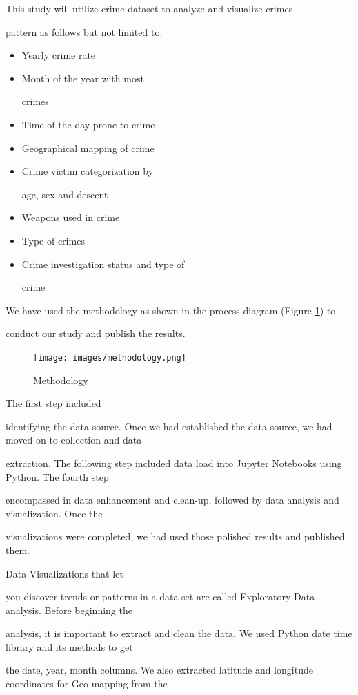 \documentclass[sigconf]{acmart}
\begin{document}
This study will utilize crime dataset to analyze and visualize crimes 

pattern as follows but not limited to:
\begin{itemize}
\item Yearly crime rate
\item Month of the year with most 

crimes
\item Time of the day prone to crime
\item Geographical mapping of crime
\item Crime victim categorization by 

age, sex and descent
\item Weapons used in crime
\item Type of crimes
\item Crime investigation status and type of 

crime

\end{itemize}

We have used the methodology as shown in the process diagram (Figure \ref{f:meyhodology}) to 

conduct our study and publish the results.
\begin{figure}[!ht]
  \centering\texttt{[image: images/methodology.png]}
  \caption{Methodology}\label{f:meyhodology}
\end{figure}

The first step included 

identifying the data source. Once we had established the data source, we had moved on to collection and data 

extraction. The following step included data load into Jupyter Notebooks using Python. The fourth step 

encompassed in data enhancement and clean-up, followed by data analysis and visualization. Once the 

visualizations were completed, we had used those polished results and published them.

Data Visualizations that let 

you discover trends or patterns in a data set are called Exploratory Data analysis. Before beginning the 

analysis, it is important to extract and clean the data. We used Python date time library and its methods to get 

the date, year, month columns. We also extracted latitude and longitude coordinates for Geo mapping from the 
\end{document}
